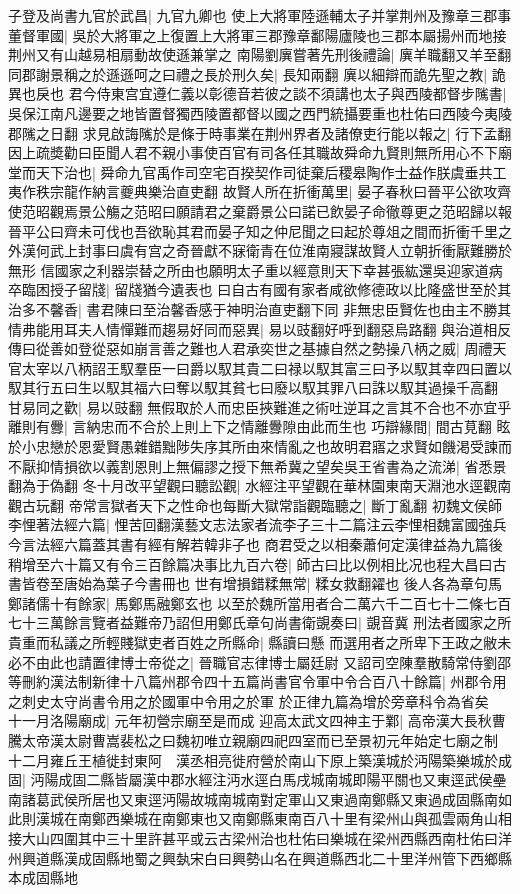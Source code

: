 子登及尚書九官於武昌|{
	九官九卿也}
使上大將軍陸遜輔太子并掌荆州及豫章三郡事董督軍國|{
	吳於大將軍之上復置上大將軍三郡豫章鄱陽廬陵也三郡本屬揚州而地接荆州又有山越易相扇動故使遜兼掌之}
南陽劉廙嘗著先刑後禮論|{
	廙羊職翻又羊至翻}
同郡謝景稱之於遜遜呵之曰禮之長於刑久矣|{
	長知兩翻}
廙以細辯而詭先聖之教|{
	詭異也戾也}
君今侍東宫宜遵仁義以彰德音若彼之談不須講也太子與西陵都督步隲書|{
	吳保江南凡邊要之地皆置督獨西陵置都督以國之西門統攝要重也杜佑曰西陵今夷陵郡隲之日翻}
求見啟誨隲於是條于時事業在荆州界者及諸僚吏行能以報之|{
	行下孟翻}
因上疏奬勸曰臣聞人君不親小事使百官有司各任其職故舜命九賢則無所用心不下廟堂而天下治也|{
	舜命九官禹作司空宅百揆契作司徒棄后稷皋陶作士益作朕虞垂共工夷作秩宗龍作納言夔典樂治直吏翻}
故賢人所在折衝萬里|{
	晏子春秋曰晉平公欲攻齊使范昭觀焉景公觴之范昭曰願請君之棄爵景公曰諾已飲晏子命徹尊更之范昭歸以報晉平公曰齊未可伐也吾欲恥其君而晏子知之仲尼聞之曰起於尊俎之間而折衝千里之外漢何武上封事曰虞有宫之奇晉獻不寐衛青在位淮南寢謀故賢人立朝折衝厭難勝於無形}
信國家之利器崇替之所由也願明太子重以經意則天下幸甚張紘還吳迎家道病卒臨困授子留牋|{
	留牋猶今遺表也}
曰自古有國有家者咸欲修德政以比隆盛世至於其治多不馨香|{
	書君陳曰至治馨香感于神明治直吏翻下同}
非無忠臣賢佐也由主不勝其情弗能用耳夫人情憚難而趨易好同而惡異|{
	易以豉翻好呼到翻惡烏路翻}
與治道相反傳曰從善如登從惡如崩言善之難也人君承奕世之基據自然之勢操八柄之威|{
	周禮天官太宰以八柄詔王馭羣臣一曰爵以馭其貴二曰禄以馭其富三曰予以馭其幸四曰置以馭其行五曰生以馭其福六曰奪以馭其貧七曰廢以馭其罪八曰誅以馭其過操千高翻}
甘易同之歡|{
	易以豉翻}
無假取於人而忠臣挾難進之術吐逆耳之言其不合也不亦宜乎離則有釁|{
	言納忠而不合於上則上下之情離釁隙由此而生也}
巧辯緣間|{
	間古莧翻}
眩於小忠戀於恩愛賢愚雜錯黜陟失序其所由來情亂之也故明君寤之求賢如饑渇受諫而不厭抑情損欲以義割恩則上無偏謬之授下無希冀之望矣吳王省書為之流涕|{
	省悉景翻為于偽翻}
冬十月改平望觀曰聽訟觀|{
	水經注平望觀在華林園東南天淵池水逕觀南觀古玩翻}
帝常言獄者天下之性命也每斷大獄常詣觀臨聽之|{
	斷丁亂翻}
初魏文侯師李悝著法經六篇|{
	悝苦回翻漢藝文志法家者流李子三十二篇注云李悝相魏富國強兵今言法經六篇蓋其書有經有解若韓非子也}
商君受之以相秦蕭何定漢律益為九篇後稍增至六十篇又有令三百餘篇决事比九百六卷|{
	師古曰比以例相比况也程大昌曰古書皆卷至唐始為葉子今書冊也}
世有增損錯糅無常|{
	糅女救翻糴也}
後人各為章句馬鄭諸儒十有餘家|{
	馬鄭馬融鄭玄也}
以至於魏所當用者合二萬六千二百七十二條七百七十三萬餘言覽者益難帝乃詔但用鄭氏章句尚書衛覬奏曰|{
	覬音冀}
刑法者國家之所貴重而私議之所輕賤獄吏者百姓之所縣命|{
	縣讀曰懸}
而選用者之所卑下王政之敝未必不由此也請置律博士帝從之|{
	晉職官志律博士屬廷尉}
又詔司空陳羣散騎常侍劉邵等刪約漢法制新律十八篇州郡令四十五篇尚書官令軍中令合百八十餘篇|{
	州郡令用之刺史太守尚書令用之於國軍中令用之於軍}
於正律九篇為增於旁章科令為省矣　十一月洛陽廟成|{
	元年初營宗廟至是而成}
迎高太武文四神主于鄴|{
	高帝漢大長秋曹騰太帝漢太尉曹嵩裴松之曰魏初唯立親廟四祀四室而已至景初元年始定七廟之制}
十二月雍丘王植徙封東阿　漢丞相亮徙府營於南山下原上築漢城於沔陽築樂城於成固|{
	沔陽成固二縣皆屬漢中郡水經注沔水逕白馬戌城南城即陽平關也又東逕武侯壘南諸葛武侯所居也又東逕沔陽故城南城南對定軍山又東過南鄭縣又東過成固縣南如此則漢城在南鄭西樂城在南鄭東也又南鄭縣東南百八十里有梁州山與孤雲兩角山相接大山四圍其中三十里許甚平或云古梁州治也杜佑曰樂城在梁州西縣西南杜佑曰洋州興道縣漢成固縣地蜀之興埶宋白曰興勢山名在興道縣西北二十里洋州管下西鄉縣本成固縣地}


